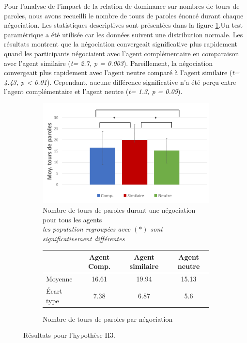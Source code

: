 			Pour l'analyse de l'impact de la relation de dominance sur nombres de tours de paroles, nous avons recueilli le nombre de tours de paroles énoncé durant chaque négociation. Les statistiques descriptives sont présentées dans la figure \ref{fig:tour}.Un test paramétrique a été utilisée car les données suivent une distribution normale. Les résultats montrent que la négociation convergeait significative plus rapidement quand les participants négociaient avec l'agent complémentaire en comparaison avec l'agent similaire (\emph{t= 2.7, p = 0.003}). Pareillement, la négociation convergeait plus rapidement avec l'agent neutre comparé à l'agent similaire (\emph{t= 4.43, p < 0.01}).  
			Cependant, aucune différence significative n'a été perçu entre l'agent complémentaire et l'agent neutre (\emph{t= 1.3, p = 0.09}).  
			
		\begin{figure}[h]
			
			\begin{subfigure}[h]{0.8\textwidth}
				\centering
				\includegraphics[clip=false]{Figures/chap7/tours.PNG}
				\caption{Nombre de tours de paroles durant une négociation pour tous les agents \\ \textit{les population regroupées avec $(*)$ sont significativement différentes }}
			\end{subfigure}
		
			\begin{subfigure}[h]{0.8\textwidth}
				\centering
				\begin{tabular}{ l c c c }
					\hline
					\textbf{ }& \textbf{Agent Comp.} & \textbf{Agent similaire} & \textbf{Agent neutre} \\ 
					\hline
					\newline Moyenne & 16.61& 19.94 & 15.13 \\
					\newline Écart type & 7.38 & 6.87 & 5.6 \\
					\hline
					
				\end{tabular}
				\caption{Nombre de tours de paroles par négociation} 
			\end{subfigure}
			\caption{Résultats pour l'hypothèse H3.}
			\label{fig:tour}
	\end{figure}

